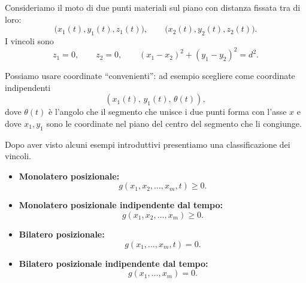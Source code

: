 \begin{example}{}
Consideriamo il moto di due punti materiali sul piano con distanza fissata tra di loro:
\[
\bigl(x_1(t),y_1(t),z_1(t)\bigr),\qquad \bigl(x_2(t),y_2(t),z_2(t)\bigr).
\]
I vincoli sono
\[
z_1=0,\qquad z_2=0,\qquad (x_1-x_2)^2+(y_1-y_2)^2=d^2.
\]

Possiamo usare coordinate ``convenienti'': ad esempio scegliere come coordinate indipendenti
\[
(x_1(t),\,y_1(t),\,\theta(t)),
\]
dove $\theta(t)$ è l'angolo che il segmento che unisce i due punti forma con l'asse $x$ e dove $x_1 , y_1$ sono le coordinate nel piano del centro del segmento che li congiunge.

\medskip

\begin{center}
\end{center}
\end{example}

Dopo aver visto alcuni esempi introduttivi presentiamo una classificazione dei vincoli.
\begin{itemize}
\item \textbf{Monolatero posizionale:}
\[
g(x_1,x_2,\dots,x_m,t)\ge 0.
\]

\item \textbf{Monolatero posizionale indipendente dal tempo:}
\[
g(x_1,x_2,\dots,x_m)\ge 0.
\]

\item \textbf{Bilatero posizionale:}
\[
g(x_1,\dots,x_m,t)=0.
\]

\item \textbf{Bilatero posizionale indipendente dal tempo:}
\[
g(x_1,\dots,x_m)=0.
\]
\end{itemize}

